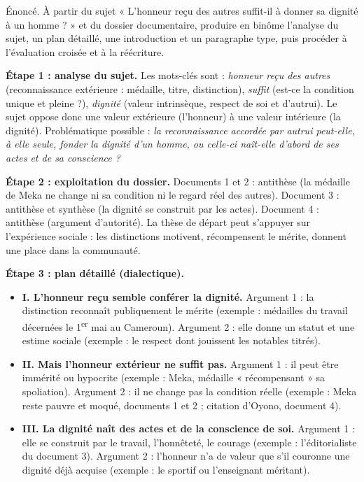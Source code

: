 \documentclass[11pt]{article}
\begin{document}
\begin{exoresolu}
Énoncé. À partir du sujet « L'honneur reçu des autres suffit-il à donner sa dignité à un homme ? » et du dossier documentaire, produire en binôme l'analyse du sujet, un plan détaillé, une introduction et un paragraphe type, puis procéder à l'évaluation croisée et à la réécriture.

\tcblower

\textbf{Étape 1 : analyse du sujet.} Les mots-clés sont : \emph{honneur reçu des autres} (reconnaissance extérieure : médaille, titre, distinction), \emph{suffit} (est-ce la condition unique et pleine ?), \emph{dignité} (valeur intrinsèque, respect de soi et d'autrui). Le sujet oppose donc une valeur extérieure (l'honneur) à une valeur intérieure (la dignité). Problématique possible : \emph{la reconnaissance accordée par autrui peut-elle, à elle seule, fonder la dignité d'un homme, ou celle-ci naît-elle d'abord de ses actes et de sa conscience ?}

\textbf{Étape 2 : exploitation du dossier.} Documents 1 et 2 : antithèse (la médaille de Meka ne change ni sa condition ni le regard réel des autres). Document 3 : antithèse et synthèse (la dignité se construit par les actes). Document 4 : antithèse (argument d'autorité). La thèse de départ peut s'appuyer sur l'expérience sociale : les distinctions motivent, récompensent le mérite, donnent une place dans la communauté.

\textbf{Étape 3 : plan détaillé (dialectique).}
\begin{itemize}
\item \textbf{I. L'honneur reçu semble conférer la dignité.} Argument 1 : la distinction reconnaît publiquement le mérite (exemple : médailles du travail décernées le 1\textsuperscript{er} mai au Cameroun). Argument 2 : elle donne un statut et une estime sociale (exemple : le respect dont jouissent les notables titrés).
\item \textbf{II. Mais l'honneur extérieur ne suffit pas.} Argument 1 : il peut être immérité ou hypocrite (exemple : Meka, médaille « récompensant » sa spoliation). Argument 2 : il ne change pas la condition réelle (exemple : Meka reste pauvre et moqué, documents 1 et 2 ; citation d'Oyono, document 4).
\item \textbf{III. La dignité naît des actes et de la conscience de soi.} Argument 1 : elle se construit par le travail, l'honnêteté, le courage (exemple : l'éditorialiste du document 3). Argument 2 : l'honneur n'a de valeur que s'il couronne une dignité déjà acquise (exemple : le sportif ou l'enseignant méritant).
\end{itemize}


\end{exoresolu}
\end{document}

